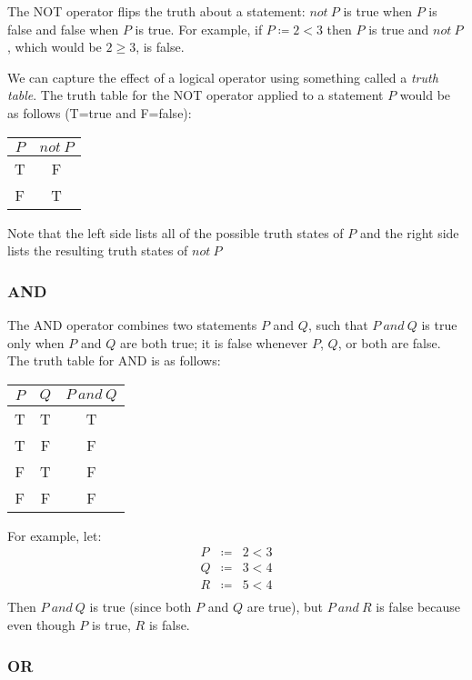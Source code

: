\documentclass[letterpaper,12pt,fleqn]{article}
\begin{document}
The NOT operator flips the truth about a statement: $not\ P$ is true when $P$
is false and false when $P$ is true. For example, if $P\coloneqq 2<3$ then $P$
is true and $not\ P$, which would be $2\ge3$, is false.

\newpage

We can capture the effect of a logical operator using something called a
\emph{truth table}. The truth table for the NOT operator applied to a statement
$P$ would be as follows (T=true and F=false):

\begin{tabular}{|c|c|}
\hline
$P$ & $not\ P$ \\
\hline
T & F \\
\hline
F & T \\
\hline
\end{tabular}

Note that the left side lists all of the possible truth states of $P$ and the
right side lists the resulting truth states of $not\ P$

\subsubsection*{AND}

The AND operator combines two statements $P$ and $Q$, such that $P\ and\ Q$ is
true only when $P$ and $Q$ are both true; it is false whenever $P$, $Q$, or
both are false. The truth table for AND is as follows:

\begin{tabular}{|cc|c|}
\hline
$P$ & $Q$ & $P\ and\ Q$ \\
\hline
T & T & T \\
\hline
T & F & F \\
\hline
F & T & F \\
\hline
F & F & F \\
\hline
\end{tabular}

For example, let:
\begin{eqnarray*}
P &\coloneqq& 2<3 \\
Q &\coloneqq& 3<4 \\
R &\coloneqq& 5<4 \\
\end{eqnarray*}
Then $P\ and\ Q$ is true (since both $P$ and $Q$ are true), but $P\ and\ R$ is
false because even though $P$ is true, $R$ is false.

\subsubsection*{OR}
\end{document}
